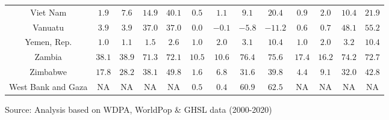 \begin{longtable}{ccccccccccccc}
Viet Nam & $1.9$ & $7.6$ & $14.9$ & $40.1$ & $0.5$ & $1.1$ & $9.1$ & $20.4$ & $0.9$ & $2.0$ & $10.4$ & $21.9$ \\ 
Vanuatu & $3.9$ & $3.9$ & $37.0$ & $37.0$ & $0.0$ & $-0.1$ & $-5.8$ & $-11.2$ & $0.6$ & $0.7$ & $48.1$ & $55.2$ \\ 
Yemen, Rep. & $1.0$ & $1.1$ & $1.5$ & $2.6$ & $1.0$ & $2.0$ & $3.1$ & $10.4$ & $1.0$ & $2.0$ & $3.2$ & $10.4$ \\ 
Zambia & $38.1$ & $38.9$ & $71.3$ & $72.1$ & $10.5$ & $10.6$ & $76.4$ & $75.6$ & $17.4$ & $16.2$ & $74.2$ & $72.7$ \\ 
Zimbabwe & $17.8$ & $28.2$ & $38.1$ & $49.8$ & $1.6$ & $6.8$ & $31.6$ & $39.8$ & $4.4$ & $9.1$ & $32.0$ & $42.8$ \\ 
West Bank and Gaza & NA & NA & NA & NA & $0.5$ & $0.4$ & $60.9$ & $62.5$ & NA & NA & NA & NA \\ 
\bottomrule
\end{longtable}
\begin{minipage}{\linewidth}
Source: Analysis based on WDPA, WorldPop \& GHSL data (2000-2020)\\
\end{minipage}

